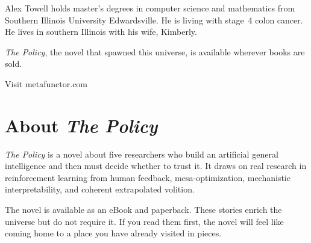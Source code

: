 \documentclass[11pt,twoside]{book}
\begin{document}
Alex Towell holds master's degrees in computer science and mathematics from Southern Illinois University Edwardsville. He is living with stage~4 colon cancer. He lives in southern Illinois with his wife, Kimberly.

\medskip

\noindent \textit{The Policy}, the novel that spawned this universe, is available wherever books are sold.

\medskip

\noindent Visit metafunctor.com

\clearpage

\chapter*{About \textit{The Policy}}

\textit{The Policy} is a novel about five researchers who build an artificial general intelligence and then must decide whether to trust it. It draws on real research in reinforcement learning from human feedback, mesa-optimization, mechanistic interpretability, and coherent extrapolated volition.

The novel is available as an eBook and paperback. These stories enrich the universe but do not require it. If you read them first, the novel will feel like coming home to a place you have already visited in pieces.
\end{document}
